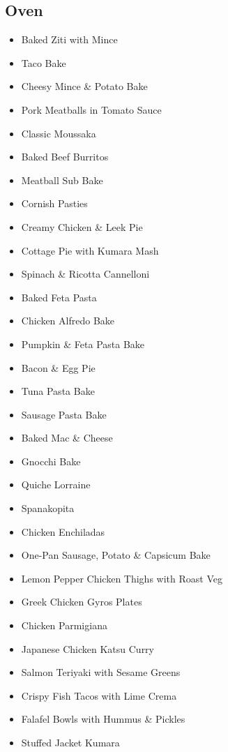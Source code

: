 \subsection*{Oven}

\begin{itemize}
  \item \todo Baked Ziti with Mince
  \item \todo Taco Bake
  \item \todo Cheesy Mince \& Potato Bake
  \item \todo Pork Meatballs in Tomato Sauce
  \item \todo Classic Moussaka
  \item \todo Baked Beef Burritos
  \item \todo Meatball Sub Bake
  \item \todo Cornish Pasties
\end{itemize}

\begin{itemize}
  \item \todo Creamy Chicken \& Leek Pie
  \item \todo Cottage Pie with Kumara Mash
  \item \todo Spinach \& Ricotta Cannelloni
  \item \todo Baked Feta Pasta
  \item \todo Chicken Alfredo Bake
  \item \todo Pumpkin \& Feta Pasta Bake
  \item \todo Bacon \& Egg Pie 
  \item \todo Tuna Pasta Bake
  \item \todo Sausage Pasta Bake
  \item \todo Baked Mac \& Cheese
  \item \todo Gnocchi Bake
  \item \todo Quiche Lorraine
  \item \todo Spanakopita
  \item \todo Chicken Enchiladas
\end{itemize}

\begin{itemize}
  \item \todo One-Pan Sausage, Potato \& Capsicum Bake
  \item \todo Lemon Pepper Chicken Thighs with Roast Veg
  \item \todo Greek Chicken Gyros Plates
  \item \todo Chicken Parmigiana
  \item \todo Japanese Chicken Katsu Curry
  \item \todo Salmon Teriyaki with Sesame Greens
  \item \todo Crispy Fish Tacos with Lime Crema
  \item \todo Falafel Bowls with Hummus \& Pickles
  \item \todo Stuffed Jacket Kumara
\end{itemize}

